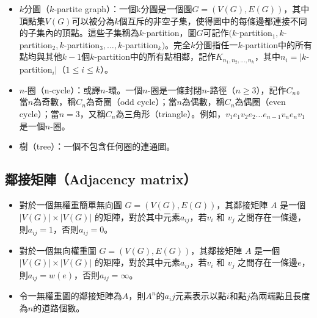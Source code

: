 \documentclass[a4paper,12pt]{report}
\begin{document}
\begin{itemize}
\item $k$分圖（$k$-partite graph）：一個k分圖是一個圖$G=(V(G), E(G))$，其中頂點集$V(G)$可以被分為$k$個互斥的非空子集，使得圖中的每條邊都連接不同的子集內的頂點。這些子集稱為$k$-partition，圖$G$可記作$(k$-partition$_1, k$-partition$_2, k$-partition$_3, \ldots, k$-partition$_k)$。完全$k$分圖指任一$k$-partition中的所有點均與其他$k-1$個$k$-partition中的所有點相鄰，記作$K_{n_1, n_2, \ldots, n_k}$，其中$n_i=|k$-partition$_i|$（$1\leq i\leq k$）。
\item $n$-圈（n-cycle）：或譯$n$-環。一個$n$-圈是一條封閉$n$-路徑（$n\geq$3），記作$C_n$。當$n$為奇數，稱$C_n$為奇圈（odd cycle）；當$n$為偶數，稱$C_n$為偶圈（even cycle）；當$n=3$，又稱$C_n$為三角形（triangle）。例如，$v_1e_1v_2e_2\ldots e_{n-1}v_ne_nv_1$是一個$n$-圈。
\item 樹（tree）：一個不包含任何圈的連通圖。
\end{itemize}
\subsection{鄰接矩陣（Adjacency matrix）}
\begin{itemize}
\item 對於一個無權重簡單無向圖 $G=(V(G), E(G))$，其鄰接矩陣 $A$ 是一個 $|V(G)|\times|V(G)|$ 的矩陣，對於其中元素$a_{ij}$，若$v_i$ 和 $v_j$ 之間存在一條邊，則$a_{ij}=1$，否則$a_{ij}=0$。
\item 對於一個無向權重圖 $G=(V(G), E(G))$，其鄰接矩陣 $A$ 是一個 $|V(G)|\times|V(G)|$ 的矩陣，對於其中元素$a_{ij}$，若$v_i$ 和 $v_j$ 之間存在一條邊$e$，則$a_{ij}=w(e)$，否則$a_{ij}=\infty$。
\item 令一無權重圖的鄰接矩陣為$A$，則$A^n$的$a_ij$元素表示以點$i$和點$j$為兩端點且長度為$n$的道路個數。
\end{itemize}
\end{document}
